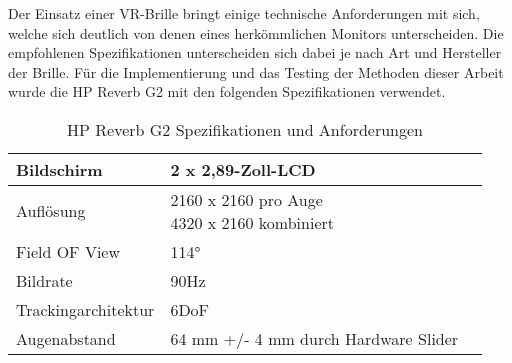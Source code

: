 Der Einsatz einer VR-Brille bringt einige technische Anforderungen mit sich, welche sich deutlich
von denen eines herkömmlichen Monitors unterscheiden. Die empfohlenen Spezifikationen unterscheiden sich dabei je nach Art und
Hersteller der Brille. Für die Implementierung und das Testing der Methoden dieser Arbeit wurde die HP Reverb G2 mit den folgenden
Spezifikationen verwendet.


\begin{table}[h]
    \renewcommand*{\arraystretch}{2}
    \setlength{\tabcolsep}{1.5cm}
    \begin{tabular}{lll}
        \hspace{-1.5cm}Bildschirm          & 2 x 2,89-Zoll-LCD                    \\ \hline
        \hspace{-1.5cm}Auflösung           & \makecell[l]{2160 x 2160 pro Auge    \\4320 x 2160 kombiniert}  \\ \hline
        \hspace{-1.5cm}Field OF View       & \raisebox{-0.6ex}{\~{ }}114°         \\ \hline
        \hspace{-1.5cm}Bildrate            & 90Hz                                 \\ \hline
        \hspace{-1.5cm}Trackingarchitektur & 6DoF                                 \\ \hline
        \hspace{-1.5cm}Augenabstand        & 64 mm +/- 4 mm durch Hardware Slider \\ \hline
    \end{tabular}
    \caption[Tabelle 1]{HP Reverb G2 Spezifikationen und Anforderungen \parencite{HPG2}}
\end{table}








